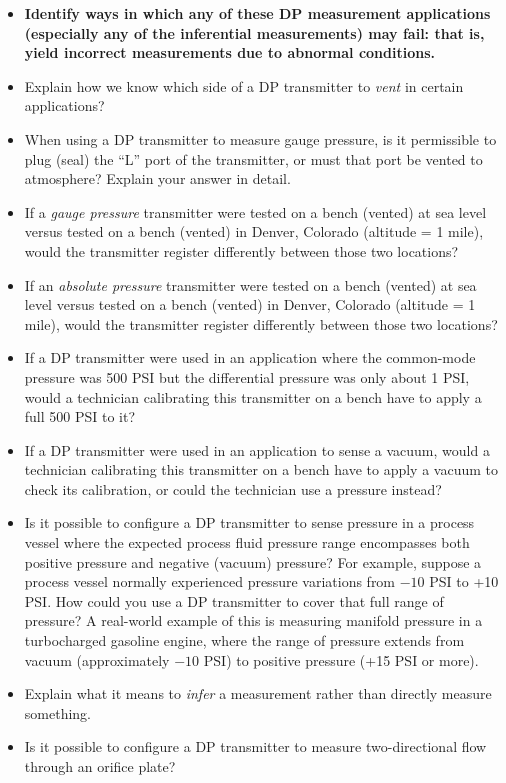\begin{itemize}
\item{} {\bf Identify ways in which any of these DP measurement applications (especially any of the inferential measurements) may fail: that is, yield incorrect measurements due to abnormal conditions.}
\item{} Explain how we know which side of a DP transmitter to {\it vent} in certain applications?
\item{} When using a DP transmitter to measure gauge pressure, is it permissible to plug (seal) the ``L'' port of the transmitter, or must that port be vented to atmosphere?  Explain your answer in detail.
\item{} If a {\it gauge pressure} transmitter were tested on a bench (vented) at sea level versus tested on a bench (vented) in Denver, Colorado (altitude = 1 mile), would the transmitter register differently between those two locations? 
\item{} If an {\it absolute pressure} transmitter were tested on a bench (vented) at sea level versus tested on a bench (vented) in Denver, Colorado (altitude = 1 mile), would the transmitter register differently between those two locations? 
\item{} If a DP transmitter were used in an application where the common-mode pressure was 500 PSI but the differential pressure was only about 1 PSI, would a technician calibrating this transmitter on a bench have to apply a full 500 PSI to it?
\item{} If a DP transmitter were used in an application to sense a vacuum, would a technician calibrating this transmitter on a bench have to apply a vacuum to check its calibration, or could the technician use a pressure instead?
\item{} Is it possible to configure a DP transmitter to sense pressure in a process vessel where the expected process fluid pressure range encompasses both positive pressure and negative (vacuum) pressure?  For example, suppose a process vessel normally experienced pressure variations from $-10$ PSI to +10 PSI.  How could you use a DP transmitter to cover that full range of pressure?  A real-world example of this is measuring manifold pressure in a turbocharged gasoline engine, where the range of pressure extends from vacuum (approximately $-10$ PSI) to positive pressure (+15 PSI or more).
\item{} Explain what it means to {\it infer} a measurement rather than directly measure something.
\item{} Is it possible to configure a DP transmitter to measure two-directional flow through an orifice plate?
\end{itemize}




















